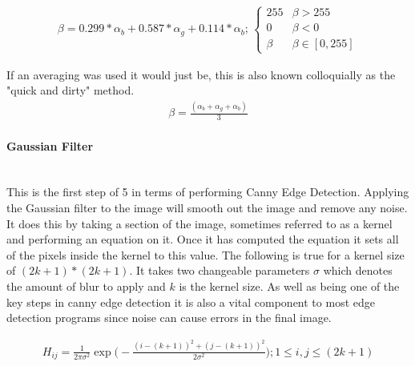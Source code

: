 \begin{FlushLeft}
            \begin{gather*}
                \beta = 0.299 * \alpha_{b} + 0.587 * \alpha_{g} + 0.114 * \alpha_{b}
                \text{; }
                \begin{cases}
                    255 & \beta > 255 \\
                    0 & \beta < 0 \\
                    \beta & \beta \in [0, 255]
                \end{cases}
            \end{gather*}
            
            \BK

            If an averaging was used it would just be, this is also known colloquially as the "quick and dirty" method. \\ \bk
            \begin{gather*}
                    \beta = \frac {(\alpha_{b} + \alpha_{g} + \alpha_{b})}{3}
            \end{gather*}

            \bk
            \paragraph{Gaussian Filter} \mbox{} \\
            This is the first step of 5 in terms of performing Canny Edge Detection. Applying the Gaussian filter to the image will smooth out the image and remove any noise. It does this by taking a section
            of the image, sometimes referred to as a kernel and performing an equation on it. Once it has computed the equation it sets all of the pixels inside the kernel to this value. The following is true 
            for a kernel size of $(2k + 1) * (2k + 1)$. It takes two changeable parameters $\sigma$ which denotes the amount of blur to apply and $k$ is the kernel size. As well as being one of the key steps in canny edge detection it is also a vital component to most edge detection programs since noise can cause errors in the final image.\\ \bk
            
            \begin{gather*}
                H_{ij} = \frac{1}{
                    2\pi\sigma^{2}
                } \exp \bigg(
                    -\frac{
                        (i - (k + 1))^{2} + (j - (k + 1))^{2}
                    }
                    {
                        2\sigma^{2}
                    }
                \bigg);1\leq i, j \leq(2k+1)
            \end{gather*}


\end{FlushLeft}

